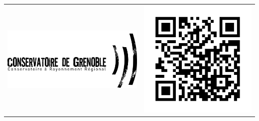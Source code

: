 \begin{titlepage}

\begin{bigcenter}


\begin{tabular}{lr}
  \begin{minipage}{0.75\linewidth}
    \vspace{0mm}
    \includegraphics[width=0.9\linewidth]{logo_crr.jpg}
  \end{minipage}
  &
  \begin{minipage}{0.25\linewidth}
    \vspace{7mm}
    \includegraphics[width=0.9\linewidth]{qr-cover.pdf}
  \end{minipage}
\end{tabular}


\end{bigcenter}
\end{titlepage}
